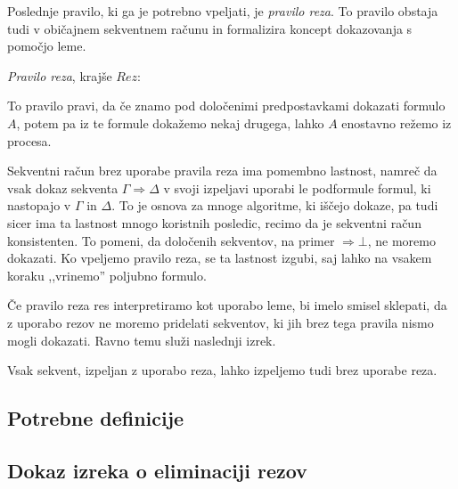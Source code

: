 Poslednje pravilo, ki ga je potrebno vpeljati, je \emph{pravilo reza}. To pravilo obstaja tudi v običajnem sekventnem računu in formalizira koncept dokazovanja s pomočjo leme.

\begin{definicija}
	\emph{Pravilo reza}, krajše $Rez$:
	\begin{prooftree}
	\end{prooftree}
	To pravilo pravi, da če znamo pod določenimi predpostavkami dokazati formulo $A$, potem pa iz te formule dokažemo nekaj drugega, lahko $A$ enostavno režemo iz procesa.
\end{definicija}

\begin{opomba}
    Sekventni račun brez uporabe pravila reza ima pomembno lastnost, namreč da vsak dokaz sekventa $\Gamma \Rightarrow \Delta$ v svoji izpeljavi uporabi le podformule formul, ki nastopajo v $\Gamma$ in $\Delta$. To je osnova za mnoge algoritme, ki iščejo dokaze, pa tudi sicer ima ta lastnost mnogo koristnih posledic, recimo da je sekventni račun konsistenten. To pomeni, da določenih sekventov, na primer $\Rightarrow \bot$, ne moremo dokazati. Ko vpeljemo pravilo reza, se ta lastnost izgubi, saj lahko na vsakem koraku ,,vrinemo'' poljubno formulo.
\end{opomba}

Če pravilo reza res interpretiramo kot uporabo leme, bi imelo smisel sklepati, da z uporabo rezov ne moremo pridelati sekventov, ki jih brez tega pravila nismo mogli dokazati. Ravno temu služi naslednji izrek.

\begin{izrek} \label{izrek}
    Vsak sekvent, izpeljan z uporabo reza, lahko izpeljemo tudi brez uporabe reza.
\end{izrek}

\subsection{Potrebne definicije} \label{defs}


\subsection{Dokaz izreka o eliminaciji rezov} \label{dokaz}

